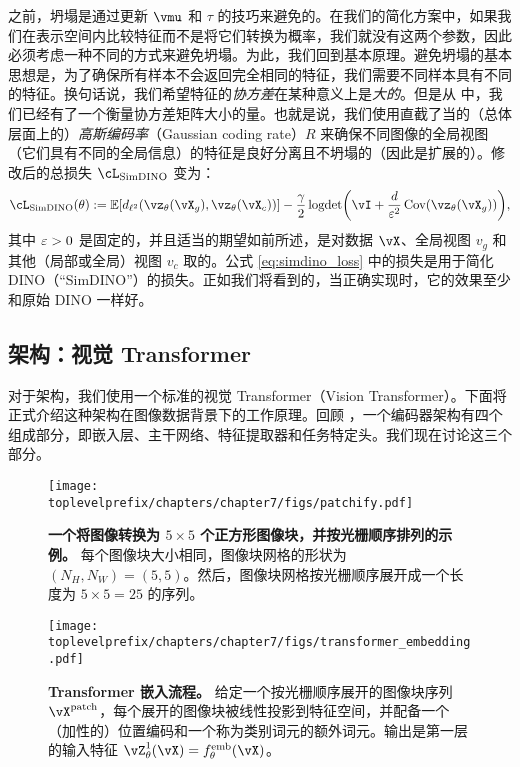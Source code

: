 \documentclass[../../book-main.tex]{subfiles}
\begin{document}
之前，坍塌是通过更新 \(\vmu\) 和 \(\tau\) 的技巧来避免的。在我们的简化方案中，如果我们在表示空间内比较特征而不是将它们转换为概率，我们就没有这两个参数，因此必须考虑一种不同的方式来避免坍塌。为此，我们回到基本原理。避免坍塌的基本思想是，为了确保所有样本不会返回完全相同的特征，我们需要不同样本具有不同的特征。换句话说，我们希望特征的\textit{协方差}在某种意义上是\textit{大的}。但是从  中，我们已经有了一个衡量协方差矩阵大小的量。也就是说，我们使用直截了当的（总体层面上的）\textit{高斯编码率}（Gaussian coding rate）\(R\) 来确保不同图像的全局视图（它们具有不同的全局信息）的特征是良好分离且不坍塌的（因此是扩展的）。修改后的总损失 \(\cL_{\simdino}\) 变为：
\begin{equation}\label{eq:simdino_loss}
    \cL_{\simdino}(\theta) := \Ex[d_{\ell^{2}}(\vz_{\theta}(\vX_{g}), \vz_{\theta}(\vX_{c}))] - \frac{\gamma}{2}\logdet\rp{\vI + \frac{d}{\eps^{2}}\Cov(\vz_{\theta}(\vX_{g}))},
\end{equation}
其中 \(\varepsilon > 0\) 是固定的，并且适当的期望如前所述，是对数据 \(\vX\)、全局视图 \(v_{g}\) 和其他（局部或全局）视图 \(v_{c}\) 取的。公式 \eqref{eq:simdino_loss} 中的损失是用于简化 DINO（“SimDINO”）的损失。正如我们将看到的，当正确实现时，它的效果至少和原始 DINO 一样好。

\subsection{架构：视觉 Transformer}\label{sub:contrastive_learning_architecture}

对于架构，我们使用一个标准的视觉 Transformer（Vision Transformer）。下面将正式介绍这种架构在图像数据背景下的工作原理。回顾 ，一个编码器架构有四个组成部分，即嵌入层、主干网络、特征提取器和任务特定头。我们现在讨论这三个部分。

\begin{figure}
    \centering 
    \texttt{[image: \\toplevelprefix/chapters/chapter7/figs/patchify.pdf]}
    \caption{\small\textbf{一个将图像转换为 \(5 \times 5\) 个正方形图像块，并按光栅顺序排列的示例。} 每个图像块大小相同，图像块网格的形状为 \((N_{H}, N_{W}) = (5, 5)\)。然后，图像块网格按光栅顺序展开成一个长度为 \(5 \times 5 = 25\) 的序列。}
    \label{fig:patchify_rasterize}
\end{figure}

\begin{figure}
    \centering 
    \texttt{[image: \\toplevelprefix/chapters/chapter7/figs/transformer\_embedding.pdf]}
    \caption{\small\textbf{Transformer 嵌入流程。} 给定一个按光栅顺序展开的图像块序列 \(\vX^{\patch}\)，每个展开的图像块被线性投影到特征空间，并配备一个（加性的）位置编码和一个称为类别词元的额外词元。输出是第一层的输入特征 \(\vZ_{\theta}^{1}(\vX) = f_{\theta}^{\emb}(\vX)\)。}
    \label{fig:transformer_embedding}
\end{figure}
\end{document}
